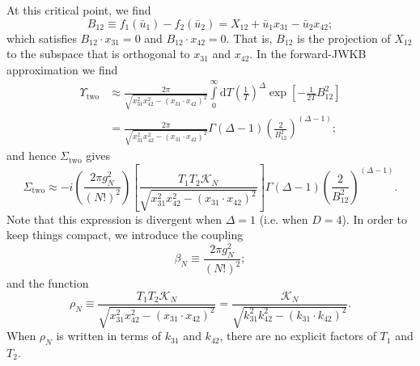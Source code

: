 At this critical point, we find
\begin{equation}
	B_{12} \equiv f_{1}(\bar{u}_{1}) - f_{2}(\bar{u}_{2}) = X_{1 2} + \bar{u}_{1} x_{3 1} - \bar{u}_{2} x_{4 2};
\end{equation}
which satisfies $B_{12} \cdot x_{31} = 0$ and $B_{12} \cdot x_{42} = 0$. That is, $B_{12}$ is the projection of $X_{12}$ to the subspace that is orthogonal to $x_{31}$ and $x_{42}$. In the forward-JWKB approximation we find
\begin{align}
	\Upsilon_{\text{two}} &\approx \frac{2 \pi}{\sqrt{x_{31}^{2} x_{42}^{2} - (x_{31} \cdot x_{42})^{2}}} \int\limits_{0}^{\infty}\mathrm{d}T \left( \frac{1}{T} \right)^{\Delta} \exp{\left[- \frac{1}{2 T} B_{1 2}^{2} \right]} \nonumber \\
	&= \frac{2 \pi}{\sqrt{x_{31}^{2} x_{42}^{2} - (x_{31} \cdot x_{42})^{2}}} \Gamma(\Delta - 1) \left( \frac{2}{B_{1 2}^{2}} \right)^{(\Delta - 1)};
\end{align}
and hence $\Sigma_{\text{two}}$ gives
\begin{equation}
	\Sigma_{\text{two}} \approx -i \left( \frac{2 \pi g_{N}^{2}}{(N!)^{2}} \right) \left[ \frac{T_{1} T_{2} \mathcal{K}_{N}}{\sqrt{x_{31}^{2} x_{42}^{2} - (x_{31} \cdot x_{42})^{2}}} \right] \Gamma(\Delta - 1) \left( \frac{2}{B_{1 2}^{2}} \right)^{(\Delta - 1)}.
\end{equation}
Note that this expression is divergent when $\Delta = 1$ (i.e. when $D = 4$). In order to keep things compact, we introduce the coupling
\begin{equation}
	\beta_{N} \equiv \frac{2 \pi g_{N}^{2}}{(N!)^{2}};
	\label{betaN}
\end{equation}
and the function
\begin{equation}
	\rho_{N} \equiv \frac{T_{1} T_{2} \mathcal{K}_{N}}{\sqrt{x_{31}^{2} x_{42}^{2} - (x_{31} \cdot x_{42})^{2}}} = \frac{\mathcal{K}_{N}}{\sqrt{k_{31}^{2} k_{42}^{2} - (k_{31} \cdot k_{42})^{2}}}.
\end{equation}
When $\rho_{N}$ is written in terms of $k_{31}$ and $k_{42}$, there are no explicit factors of $T_{1}$ and $T_{2}$.
